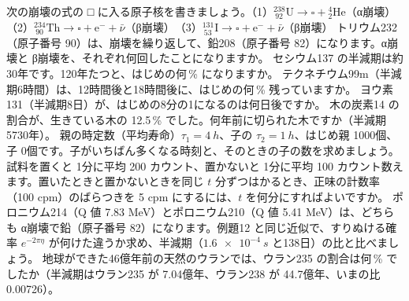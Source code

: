 \bkendproblems
{}
\bkproblem 次の崩壊の式の □ に入る原子核を書きましょう。（1）${}^{238}_{\ 92}\mathrm U\to\square+{}^4_2\mathrm{He}$（α崩壊）　（2）${}^{234}_{\ 90}\mathrm{Th}\to\square+\mathrm e^-+\bar\nu$（β崩壊）　（3）${}^{131}_{\ 53}\mathrm I\to\square+\mathrm e^-+\bar\nu$（β崩壊）
\bkproblem トリウム232（原子番号 90）は、崩壊を繰り返して、鉛208（原子番号 82）になります。α崩壊と β崩壊を、それぞれ何回したことになりますか。
\bkproblem セシウム137 の半減期は約30年です。120年たつと、はじめの何\,\% になりますか。
\bkproblem テクネチウム99m（半減期6時間）は、12時間後と18時間後に、はじめの何\,\% 残っていますか。
\bkproblem ヨウ素131（半減期8日）が、はじめの8分の1になるのは何日後ですか。
\bkproblem 木の炭素14 の割合が、生きている木の 12.5\,\% でした。何年前に切られた木ですか（半減期 5730年）。
\bkproblem 親の時定数（平均寿命）$\tau_1=\qty{4}{h}$、子の $\tau_2=\qty{1}{h}$、はじめ親 1000個、子 0個です。子がいちばん多くなる時刻と、そのときの子の数を求めましょう。
\bkproblem 試料を置くと 1分に平均 200 カウント、置かないと 1分に平均 100 カウント数えます。置いたときと置かないときを同じ $t$ 分ずつはかるとき、正味の計数率（100 cpm）のばらつきを 5 cpm にするには、$t$ を何分にすればよいですか。
\bkproblem ポロニウム214（Q 値 7.83 MeV）とポロニウム210（Q 値 5.41 MeV）は、どちらも α崩壊で鉛（原子番号 82）になります。例題12 と同じ近似で、すりぬける確率 $e^{-2\pi\eta}$ が何けた違うか求め、半減期（$\qty{1.6e-4}{s}$ と138日）の比と比べましょう。
\bkproblem 地球ができた46億年前の天然のウランでは、ウラン235 の割合は何\,\% でしたか（半減期はウラン235 が 7.04億年、ウラン238 が 44.7億年、いまの比 0.00726）。

